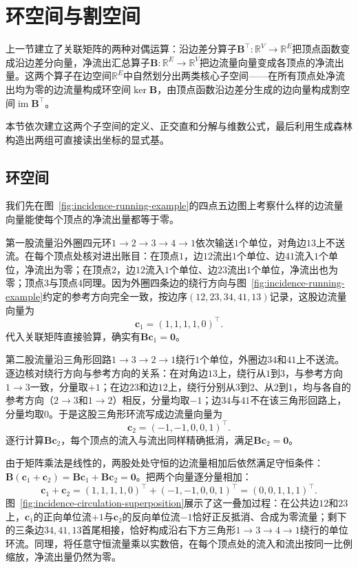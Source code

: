 \section{环空间与割空间}
\label{sec:graph-cycle-cut-spaces}

上一节建立了关联矩阵的两种对偶运算：沿边差分算子$\bm{B}^\top\colon\mathbb{R}^V\to\mathbb{R}^E$把顶点函数变成沿边差分向量，净流出汇总算子$\bm{B}\colon\mathbb{R}^E\to\mathbb{R}^V$把边流量向量变成各顶点的净流出量。这两个算子在边空间$\mathbb{R}^E$中自然划分出两类核心子空间——在所有顶点处净流出均为零的边流量构成环空间$\ker\bm{B}$，由顶点函数沿边差分生成的边向量构成割空间$\operatorname{im}\bm{B}^\top$。

本节依次建立这两个子空间的定义、正交直和分解与维数公式，最后利用生成森林构造出两组可直接读出坐标的显式基。

\subsection{环空间}
\label{sec:incidence-cycle-space}

我们先在图~\ref{fig:incidence-running-example}的四点五边图上考察什么样的边流量向量能使每个顶点的净流出量都等于零。

第一股流量沿外圈四元环$1\to2\to3\to4\to1$依次输送$1$个单位，对角边$13$上不送流。在每个顶点处核对进出账目：在顶点$1$，边$12$流出$1$个单位、边$41$流入$1$个单位，净流出为零；在顶点$2$，边$12$流入$1$个单位、边$23$流出$1$个单位，净流出也为零；顶点$3$与顶点$4$同理。因为外圈四条边的绕行方向与图~\ref{fig:incidence-running-example}约定的参考方向完全一致，按边序$(12,23,34,41,13)$记录，这股边流量向量为
\[
\bm{c}_1=(1,1,1,1,0)^\top.
\]
代入关联矩阵直接验算，确实有$\bm{B}\bm{c}_1=\bm{0}$。

第二股流量沿三角形回路$1\to3\to2\to1$绕行$1$个单位，外圈边$34$和$41$上不送流。逐边核对绕行方向与参考方向的关系：在对角边$13$上，绕行从$1$到$3$，与参考方向$1\to3$一致，分量取$+1$；在边$23$和边$12$上，绕行分别从$3$到$2$、从$2$到$1$，均与各自的参考方向（$2\to3$和$1\to2$）相反，分量均取$-1$；边$34$与$41$不在该三角形回路上，分量均取$0$。于是这股三角形环流写成边流量向量为
\[
\bm{c}_2=(-1,-1,0,0,1)^\top.
\]
逐行计算$\bm{B}\bm{c}_2$，每个顶点的流入与流出同样精确抵消，满足$\bm{B}\bm{c}_2=\bm{0}$。

由于矩阵乘法是线性的，两股处处守恒的边流量相加后依然满足守恒条件：$\bm{B}(\bm{c}_1+\bm{c}_2)=\bm{B}\bm{c}_1+\bm{B}\bm{c}_2=\bm{0}$。把两个向量逐分量相加：
\[
\bm{c}_1+\bm{c}_2=(1,1,1,1,0)^\top+(-1,-1,0,0,1)^\top=(0,0,1,1,1)^\top.
\]
图~\ref{fig:incidence-circulation-superposition}展示了这一叠加过程：在公共边$12$和$23$上，$\bm{c}_1$的正向单位流$+1$与$\bm{c}_2$的反向单位流$-1$恰好正反抵消、合成为零流量；剩下的三条边$34,41,13$首尾相接，恰好构成沿右下方三角形$1\to3\to4\to1$绕行的单位环流。同理，将任意守恒流量乘以实数倍，在每个顶点处的流入和流出按同一比例缩放，净流出量仍然为零。


